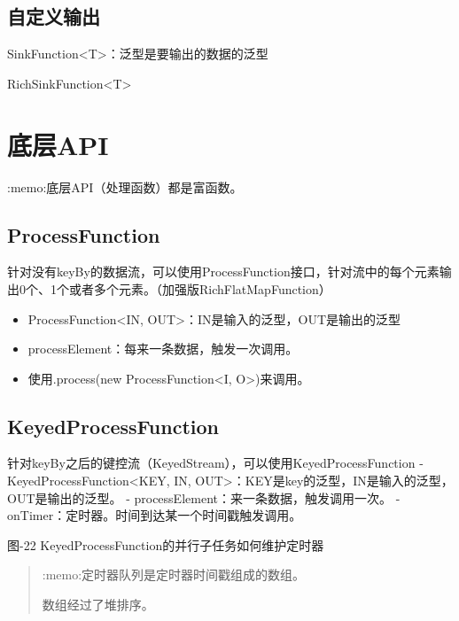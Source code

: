 \hypertarget{ux81eaux5b9aux4e49ux8f93ux51fa}{%
\subsection{自定义输出}\label{ux81eaux5b9aux4e49ux8f93ux51fa}}

SinkFunction\textless T\textgreater：泛型是要输出的数据的泛型

RichSinkFunction\textless T\textgreater{}

\hypertarget{ux5e95ux5c42api}{%
\section{底层API}\label{ux5e95ux5c42api}}

:memo:底层API（处理函数）都是{富函数}。

\hypertarget{processfunction}{%
\subsection{ProcessFunction}\label{processfunction}}

针对没有keyBy的数据流，可以使用ProcessFunction接口，针对流中的每个元素输出0个、1个或者多个元素。（加强版RichFlatMapFunction）

\begin{itemize}
\tightlist
\item
  ProcessFunction\textless IN,
  OUT\textgreater：IN是输入的泛型，OUT是输出的泛型
\item
  processElement：每来一条数据，触发一次调用。
\item
  使用.process(new ProcessFunction\textless I, O\textgreater)来调用。
\end{itemize}

\hypertarget{keyedprocessfunction}{%
\subsection{KeyedProcessFunction}\label{keyedprocessfunction}}

针对keyBy之后的键控流（KeyedStream），可以使用KeyedProcessFunction -
KeyedProcessFunction\textless KEY, IN,
OUT\textgreater：KEY是key的泛型，IN是输入的泛型，OUT是输出的泛型。 -
processElement：来一条数据，触发调用一次。 -
onTimer：定时器。时间到达某一个时间戳触发调用。

图-22 KeyedProcessFunction的并行子任务如何维护定时器

\begin{quote}
:memo:定时器队列是定时器时间戳组成的数组。

数组经过了堆排序。
\end{quote}

